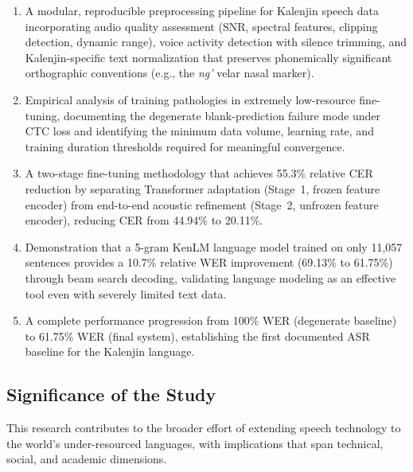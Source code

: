 \documentclass[journal]{IEEEtran}
\begin{document}
\begin{enumerate}[label=\arabic*)]
    \item A modular, reproducible preprocessing pipeline for Kalenjin speech data incorporating audio quality assessment (SNR, spectral features, clipping detection, dynamic range), voice activity detection with silence trimming, and Kalenjin-specific text normalization that preserves phonemically significant orthographic conventions (e.g., the \textit{ng'} velar nasal marker).

    \item Empirical analysis of training pathologies in extremely low-resource fine-tuning, documenting the degenerate blank-prediction failure mode under CTC loss and identifying the minimum data volume, learning rate, and training duration thresholds required for meaningful convergence.

    \item A two-stage fine-tuning methodology that achieves 55.3\% relative CER reduction by separating Transformer adaptation (Stage~1, frozen feature encoder) from end-to-end acoustic refinement (Stage~2, unfrozen feature encoder), reducing CER from 44.94\% to 20.11\%.

    \item Demonstration that a 5-gram KenLM language model trained on only 11,057 sentences provides a 10.7\% relative WER improvement (69.13\% to 61.75\%) through beam search decoding, validating language modeling as an effective tool even with severely limited text data.

    \item A complete performance progression from 100\% WER (degenerate baseline) to 61.75\% WER (final system), establishing the first documented ASR baseline for the Kalenjin language.
\end{enumerate}

\subsection{Significance of the Study}

This research contributes to the broader effort of extending speech technology to the world's under-resourced languages, with implications that span technical, social, and academic dimensions.
\end{document}
